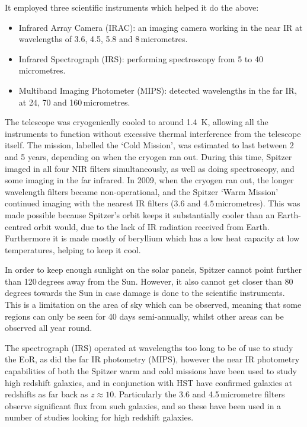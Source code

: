         It employed three scientific instruments which helped it do the above:
        \begin{itemize}
            \item Infrared Array Camera (IRAC): an imaging camera working in the near IR at wavelengths of 3.6, 4.5, 5.8 and 8\,micrometres.
            \item Infrared Spectrograph (IRS): performing spectroscopy from 5 to 40\,micrometres.
            \item Multiband Imaging Photometer (MIPS): detected wavelengths in the far IR, at 24, 70 and 160\,micrometres.
        \end{itemize}

        The telescope was cryogenically cooled to around \SI{1.4}{\kelvin}, allowing all the instruments to function without excessive thermal interference from the telescope itself. The mission, labelled the `Cold Mission', was estimated to last between 2 and 5 years, depending on when the cryogen ran out. During this time, Spitzer imaged in all four NIR filters simultaneously, as well as doing spectroscopy, and some imaging in the far infrared. In 2009, when the cryogen ran out, the longer wavelength filters became non-operational, and the Spitzer `Warm Mission' continued imaging with the nearest IR filters ($3.6$ and $4.5$\,micrometres). This was made possible because Spitzer's orbit keeps it substantially cooler than an Earth-centred orbit would, due to the lack of IR radiation received from Earth. Furthermore it is made mostly of beryllium which has a low heat capacity at low temperatures, helping to keep it cool.

        In order to keep enough sunlight on the solar panels, Spitzer cannot point further than 120\,degrees away from the Sun. However, it also cannot get closer than 80\,degrees towards the Sun in case damage is done to the scientific instruments. This is a limitation on the area of sky which can be observed, meaning that some regions can only be seen for 40 days semi-annually, whilst other areas can be observed all year round.

        The spectrograph (IRS) operated at wavelengths too long to be of use to study the EoR, as did the far IR photometry (MIPS), however the near IR photometry capabilities of both the Spitzer warm and cold missions have been used to study high redshift galaxies, and in conjunction with HST have confirmed galaxies at redshifts as far back as $z\approx10$. Particularly the 3.6 and 4.5\,micrometre filters observe significant flux from such galaxies, and so these have been used in a number of studies looking for high redshift galaxies.

